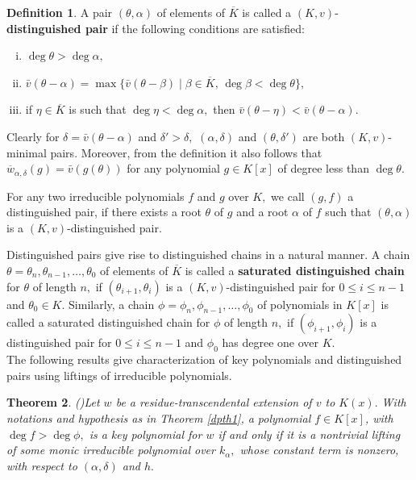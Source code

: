 \documentclass[11pt]{amsart}
\newtheorem{theorem}{Theorem}[section]
\theoremstyle{definition}
\newtheorem{definition}[theorem]{Definition}
\theoremstyle{remark}
\numberwithin{equation}{section}
\begin{document}
\begin{definition}
A pair $(\theta,\alpha)$ of elements of $\overline{K}$ is called a $(K,v)$-{\bf distinguished pair}  if the following conditions are satisfied:
\begin{enumerate}[(i)]
	\item $\deg\theta>\deg\alpha,$
	\item $\bar{v}(\theta-\alpha)=\max\{\bar{v}(\theta-\beta)\mid \beta\in\overline{K},\, \deg\beta<\deg\theta \},$
	\item if $\eta\in\overline{K}$ is such that $\deg\eta<\deg\alpha,$ then $\bar{v}(\theta-\eta)<\bar{v}(\theta-\alpha).$
\end{enumerate}
\end{definition}
Clearly for $\delta=\bar{v}(\theta-\alpha)$ and $\delta'>\delta,$ $(\alpha,\delta)$ and $(\theta,\delta')$ are both $(K,v)$-minimal pairs. Moreover, from the definition it also follows that $\overline{w}_{\alpha,\delta} (g)=\bar{v}(g(\theta))$ for any polynomial $g\in K[x]$ of degree less than $\deg \theta.$

For any two irreducible polynomials $f$ and $g$ over $K,$ we call $(g,f)$ a distinguished pair, if there exists a root $\theta$ of $g$ and a root $\alpha$ of $f$ such that $(\theta,\alpha)$ is a $(K,v)$-distinguished pair.

Distinguished pairs give rise to distinguished chains in a natural manner. A chain $\theta=\theta_n,\theta_{n-1},\ldots,\theta_0$ of elements of $\overline{K}$ is called a {\bf saturated distinguished chain}  for $\theta$  of length $n,$ if $(\theta_{i+1},\theta_{i})$ is a $(K,v)$-distinguished pair for $0\leq i\leq n-1$ and $\theta_0\in K.$  Similarly, a chain $\phi=\phi_n,\phi_{n-1},\ldots,\phi_0$ of polynomials in $K[x]$ is called a saturated distinguished chain for $\phi$  of length $n,$ if $(\phi_{i+1},\phi_{i})$ is a distinguished pair for $0\leq i\leq n-1$ and $\phi_0 $ has degree one over $K.$\\
The  following results give characterization of key polynomials and distinguished pairs using liftings of irreducible polynomials.
\begin{theorem}(\cite[Theorem 4.6]{PP})\label{ppth}
Let $w$ be a residue-transcendental extension of $v$ to $K(x).$ With notations and hypothesis as in Theorem \ref{dpth1}, a polynomial $f\in K[x]$, with $\deg f> \deg \phi,$ is a key polynomial for $w$ if and only if it is a nontrivial lifting of some monic irreducible polynomial over $k_\alpha,$ whose constant term is nonzero, with respect to $(\alpha,\delta)$ and $h.$
\end{theorem}
\end{document}

